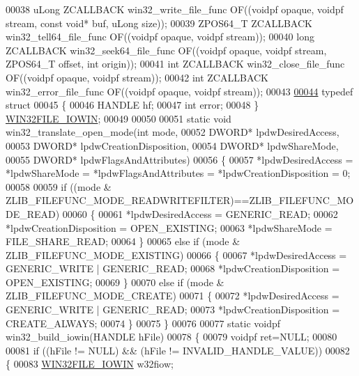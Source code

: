 \begin{DoxyCode}
00038 uLong   ZCALLBACK win32\_write\_file\_func OF((voidpf opaque, voidpf stream, \textcolor{keyword}{const} \textcolor{keywordtype}{void}* buf, uLong size));
00039 ZPOS64\_T ZCALLBACK win32\_tell64\_file\_func  OF((voidpf opaque, voidpf stream));
00040 \textcolor{keywordtype}{long}    ZCALLBACK win32\_seek64\_file\_func  OF((voidpf opaque, voidpf stream, ZPOS64\_T offset, \textcolor{keywordtype}{int} origin));
00041 \textcolor{keywordtype}{int}     ZCALLBACK win32\_close\_file\_func OF((voidpf opaque, voidpf stream));
00042 \textcolor{keywordtype}{int}     ZCALLBACK win32\_error\_file\_func OF((voidpf opaque, voidpf stream));
00043 
\hyperlink{struct_w_i_n32_f_i_l_e___i_o_w_i_n}{00044} \textcolor{keyword}{typedef} \textcolor{keyword}{struct}
00045 \{
00046     HANDLE hf;
00047     \textcolor{keywordtype}{int} error;
00048 \} \hyperlink{struct_w_i_n32_f_i_l_e___i_o_w_i_n}{WIN32FILE\_IOWIN};
00049 
00050 
00051 \textcolor{keyword}{static} \textcolor{keywordtype}{void} win32\_translate\_open\_mode(\textcolor{keywordtype}{int} mode,
00052                                       DWORD* lpdwDesiredAccess,
00053                                       DWORD* lpdwCreationDisposition,
00054                                       DWORD* lpdwShareMode,
00055                                       DWORD* lpdwFlagsAndAttributes)
00056 \{
00057     *lpdwDesiredAccess = *lpdwShareMode = *lpdwFlagsAndAttributes = *lpdwCreationDisposition = 0;
00058 
00059     \textcolor{keywordflow}{if} ((mode & ZLIB\_FILEFUNC\_MODE\_READWRITEFILTER)==ZLIB\_FILEFUNC\_MODE\_READ)
00060     \{
00061         *lpdwDesiredAccess = GENERIC\_READ;
00062         *lpdwCreationDisposition = OPEN\_EXISTING;
00063         *lpdwShareMode = FILE\_SHARE\_READ;
00064     \}
00065     \textcolor{keywordflow}{else} \textcolor{keywordflow}{if} (mode & ZLIB\_FILEFUNC\_MODE\_EXISTING)
00066     \{
00067         *lpdwDesiredAccess = GENERIC\_WRITE | GENERIC\_READ;
00068         *lpdwCreationDisposition = OPEN\_EXISTING;
00069     \}
00070     \textcolor{keywordflow}{else} \textcolor{keywordflow}{if} (mode & ZLIB\_FILEFUNC\_MODE\_CREATE)
00071     \{
00072         *lpdwDesiredAccess = GENERIC\_WRITE | GENERIC\_READ;
00073         *lpdwCreationDisposition = CREATE\_ALWAYS;
00074     \}
00075 \}
00076 
00077 \textcolor{keyword}{static} voidpf win32\_build\_iowin(HANDLE hFile)
00078 \{
00079     voidpf ret=NULL;
00080 
00081     \textcolor{keywordflow}{if} ((hFile != NULL) && (hFile != INVALID\_HANDLE\_VALUE))
00082     \{
00083         \hyperlink{struct_w_i_n32_f_i_l_e___i_o_w_i_n}{WIN32FILE\_IOWIN} w32fiow;

\end{DoxyCode}

